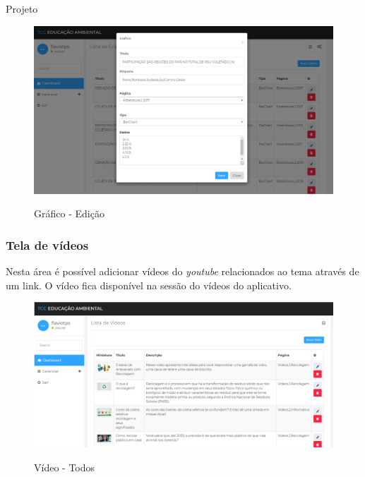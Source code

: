\documentclass[
	12pt,				%
	openright,			%
	twoside,			%
	a4paper,			%
	english,			%
	french,				%
	spanish,			%
	brazil				%
	]{abntex2}
\begin{document}
\begin{chapter}{Projeto}
\begin{figure}[h]
\centering
   \caption{Gráfico - Edição}
   \includegraphics[scale=0.40]{media/tela_graficos_site_2.png}
     \label{fig:tela_graficos_site_2}
\end{figure}

\newpage
\subsubsection{Tela de vídeos}
Nesta área é possível adicionar vídeos do \textit{youtube} relacionados ao tema através de um link. O vídeo fica disponível na sessão do vídeos do aplicativo.

\begin{figure}[h]
\centering
   \caption{Vídeo - Todos}
   \includegraphics[scale=0.40]{media/tela_video_site_1.png}
     \label{fig:tela_video_site_1}
\end{figure}


\end{chapter}
\end{document}
